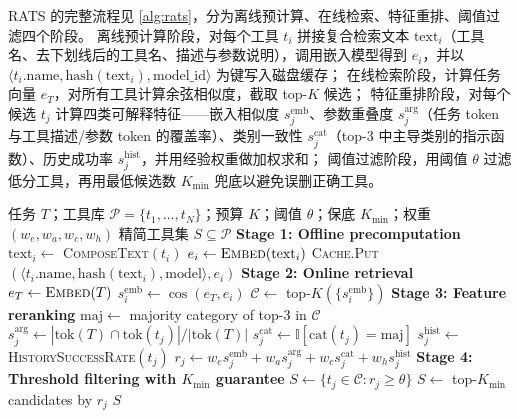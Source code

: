 RATS 的完整流程见 \autoref{alg:rats}，分为离线预计算、在线检索、特征重排、阈值过滤四个阶段。
离线预计算阶段，对每个工具 $t_i$ 拼接复合检索文本 $\mathrm{text}_i$（工具名、去下划线后的工具名、描述与参数说明），调用嵌入模型得到 $e_i$，并以 $\langle t_i.\text{name}, \mathrm{hash}(\mathrm{text}_i), \text{model\_id}\rangle$ 为键写入磁盘缓存；
在线检索阶段，计算任务向量 $e_T$，对所有工具计算余弦相似度，截取 top-$K$ 候选；
特征重排阶段，对每个候选 $t_j$ 计算四类可解释特征——嵌入相似度 $s^{\text{emb}}_j$、参数重叠度 $s^{\text{arg}}_j$（任务 token 与工具描述/参数 token 的覆盖率）、类别一致性 $s^{\text{cat}}_j$（top-3 中主导类别的指示函数）、历史成功率 $s^{\text{hist}}_j$，并用经验权重做加权求和；
阈值过滤阶段，用阈值 $\theta$ 过滤低分工具，再用最低候选数 $K_{\min}$ 兜底以避免误删正确工具。

\begin{algorithm}[ht]
\caption{RATS: Retrieval-Augmented Tool Selection}
\label{alg:rats}
\begin{algorithmic}[1]
\REQUIRE 任务 $T$；工具库 $\mathcal{P}=\{t_1,\dots,t_N\}$；预算 $K$；阈值 $\theta$；保底 $K_{\min}$；权重 $(w_e,w_a,w_c,w_h)$
\ENSURE 精简工具集 $S\subseteq\mathcal{P}$
\STATE \textbf{Stage 1: Offline precomputation}
    \STATE $\mathrm{text}_i\gets$ \textsc{ComposeText}$(t_i)$
    \STATE $e_i\gets\textsc{Embed}(\mathrm{text}_i)$
    \STATE \textsc{Cache}.\textsc{Put}$(\langle t_i.\text{name},\mathrm{hash}(\mathrm{text}_i),\text{model}\rangle, e_i)$
\ENDFOR
\STATE \textbf{Stage 2: Online retrieval}
\STATE $e_T\gets\textsc{Embed}(T)$
    \STATE $s^{\text{emb}}_i\gets\cos(e_T, e_i)$
\ENDFOR
\STATE $\mathcal{C}\gets$ top-$K(\{s^{\text{emb}}_i\})$
\STATE \textbf{Stage 3: Feature reranking}
\STATE $\mathrm{maj}\gets$ majority category of top-3 in $\mathcal{C}$
    \STATE $s^{\text{arg}}_j\gets|\mathrm{tok}(T)\cap\mathrm{tok}(t_j)|/|\mathrm{tok}(T)|$
    \STATE $s^{\text{cat}}_j\gets\mathbb{I}[\mathrm{cat}(t_j)=\mathrm{maj}]$
    \STATE $s^{\text{hist}}_j\gets$ \textsc{HistorySuccessRate}$(t_j)$
    \STATE $r_j\gets w_e s^{\text{emb}}_j + w_a s^{\text{arg}}_j + w_c s^{\text{cat}}_j + w_h s^{\text{hist}}_j$
\ENDFOR
\STATE \textbf{Stage 4: Threshold filtering with $K_{\min}$ guarantee}
\STATE $S\gets\{t_j\in\mathcal{C}:r_j\ge\theta\}$
    \STATE $S\gets$ top-$K_{\min}$ candidates by $r_j$
\ENDIF
\RETURN $S$
\end{algorithmic}
\end{algorithm}

